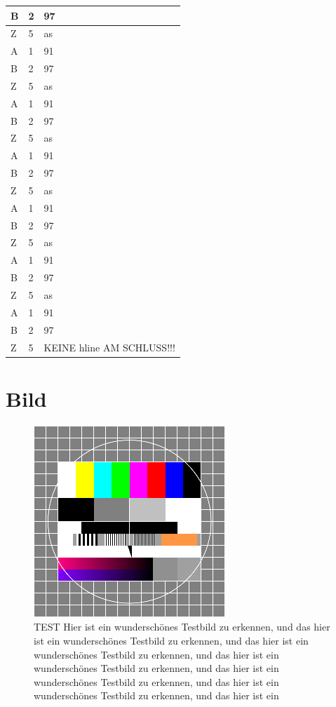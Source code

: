 \documentclass[
12pt, %
toc=listofnumbered, %
toc=chapterentrydotfill, %
numbers=noenddot, %
captions=tableheading, %
]{scrreprt}
\let\Oldsection\section
\renewcommand{\section}{\FloatBarrier\Oldsection}
\begin{document}
\begin{longtable}{|L{3.6cm}|L{6cm}|L{6cm}|}
	B&2&97\\\hline
    Z&5&as\\\hline
	A&1&91\\\hline
	B&2&97\\\hline
	Z&5&as\\\hline
	A&1&91\\\hline
	B&2&97\\\hline
    Z&5&as\\\hline
	A&1&91\\\hline
	B&2&97\\\hline
	Z&5&as\\\hline
	A&1&91\\\hline
	B&2&97\\\hline
	Z&5&as\\\hline
	A&1&91\\\hline
	B&2&97\\\hline
	Z&5&as\\\hline
	A&1&91\\\hline
	B&2&97\\\hline
	Z&5&KEINE hline AM SCHLUSS!!!\\
\end{longtable}

\section{Bild}

\begin{figure}[tph]
	\begin{center}
		\includegraphics[scale = 1]{./images/0_testbild.png}
		\caption{TEST Hier ist ein wunderschönes Testbild zu erkennen, und das hier ist ein wunderschönes Testbild zu erkennen, und das hier ist ein wunderschönes Testbild zu erkennen, und das hier ist ein wunderschönes Testbild zu erkennen, und das hier ist ein wunderschönes Testbild zu erkennen, und das hier ist ein wunderschönes Testbild zu erkennen, und das hier ist ein}
		\label{fig:testbild}
	\end{center}
\end{figure}
\end{document}
